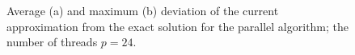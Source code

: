 \documentclass[smallcondensed]{svjour3}     %
\begin{document}
\begin{figure}
\begin{minipage}{0.5\linewidth}
\end{minipage}
\hfill
\begin{minipage}{0.5\linewidth}
\end{minipage}
\caption{Average (a) and maximum (b) deviation of the current approximation from the exact solution for the parallel algorithm; the number of threads $p = 24$.}
\label{fig_last4}
\end{figure}
\end{document}
